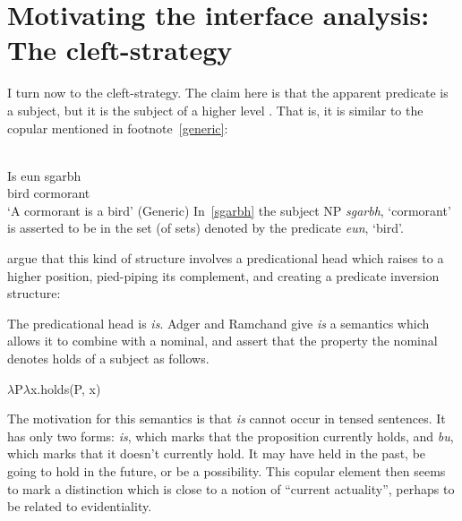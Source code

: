 \documentclass[output=paper]{langsci/langscibook}
\begin{document}
\section{Motivating the interface analysis: The cleft-strategy}\label{motiv2}\largerpage[-1]

I turn now to the cleft-strategy. The claim here is that the apparent predicate
is a subject, but it is the subject of a higher level . That is, it
is similar to the copular  mentioned in footnote~\ref{generic}:

\ea {} \label{sgarbh}\\
\gll   Is eun sgarbh\\
\Cop{} bird cormorant\\
\glt \enquote*{A cormorant is a bird} (Generic)
\z
In~\eqref{sgarbh} the subject NP \emph{sgarbh}, `cormorant' is asserted to be in
the set (of sets) denoted by the predicate \emph{eun}, `bird'.

\citet{adger-ramchand:03} argue that this kind of structure involves a
predicational head which raises to a higher position, pied-piping its
complement, and creating a predicate inversion structure:

\ea \label{copularinversion}
\z

The predicational head is \emph{is}. Adger and Ramchand give \emph{is} a semantics which allows it to combine with a nominal, and assert that the property the nominal denotes holds of a subject as follows.\largerpage[-1]

\ea $\lambda$P$\lambda$x.holds(P, x) \z

The motivation for this semantics is that \emph{is} cannot occur in tensed sentences. It has only two forms: \emph{is}, which marks that the proposition currently holds, and \emph{bu}, which marks that it doesn't currently hold. It may have held in the past, be going to hold in the future, or be a possibility. This copular element then seems to mark a distinction which
is close to a notion of ``current actuality'', perhaps to be related to evidentiality.
\end{document}
